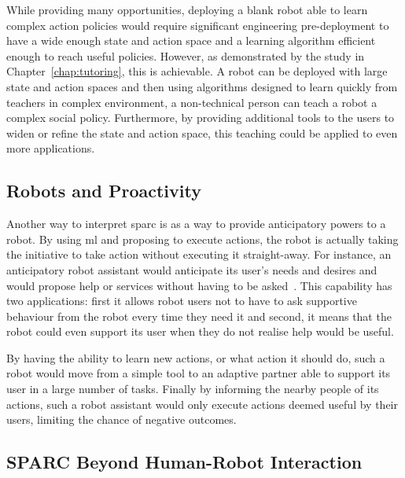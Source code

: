 While providing many opportunities, deploying a blank robot able to learn complex action policies would require significant engineering pre-deployment to have a wide enough state and action space and a learning algorithm efficient enough to reach useful policies. However, as demonstrated by the study in Chapter~\ref{chap:tutoring}, this is achievable. A robot can be deployed with large state and action spaces and then using algorithms designed to learn quickly from teachers in complex environment, a non-technical person can teach a robot a complex social policy. Furthermore, by providing additional tools to the users to widen or refine the state and action space, this teaching could be applied to even more applications.



\subsection{Robots and Proactivity}
Another way to interpret \gls{sparc} is as a way to provide anticipatory powers to a robot. By using \gls{ml} and proposing to execute actions, the robot is actually taking the initiative to take action without executing it straight-away. For instance, an anticipatory robot assistant would anticipate its user's needs and desires and would propose help or services without having to be asked~\citep{mason2011robot}. This capability has two applications: first it allows robot users not to have to ask supportive behaviour from the robot every time they need it and second, it means that the robot could even support its user when they do not realise help would be useful.

By having the ability to learn new actions, or what action it should do, such a robot would move from a simple tool to an adaptive partner able to support its user in a large number of tasks. Finally by informing the nearby people of its actions, such a robot assistant would only execute actions deemed useful by their users, limiting the chance of negative outcomes.

\subsection{SPARC Beyond Human-Robot Interaction}\label{sec:disc_beyond}

